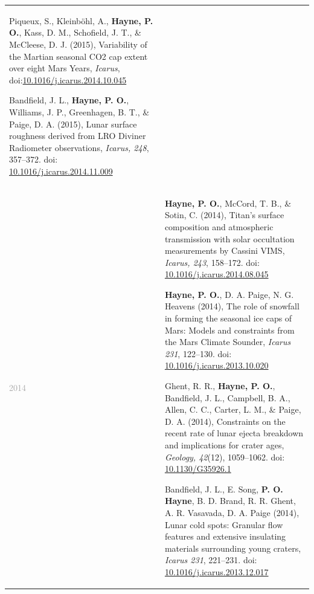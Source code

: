 \documentclass[letterpaper,10pt,twoside]{article}
\begin{document}
\begin{longtable}{@{} p{} p{}}
\begin{enumerate} [leftmargin=!,labelindent=2.5pt,itemindent=-10pt]
{            \item Piqueux, S., Kleinb{\"o}hl, A., {\bf Hayne, P. O.}, Kass, D. M., Schofield, J. T., \& McCleese, D. J. (2015), Variability of the Martian seasonal CO2 cap extent over eight Mars Years, {\it Icarus}, doi:\href{https://doi.org/10.1016/j.icarus.2014.10.045}{10.1016/j.icarus.2014.10.045}
    
            \item Bandfield, J. L., {\bf Hayne, P. O.}, Williams, J. P., Greenhagen, B. T., \& Paige, D. A. (2015), Lunar surface roughness derived from LRO Diviner Radiometer observations, {\it Icarus, 248}, 357--372. doi: \href{https://doi.org/10.1016/j.icarus.2014.11.009}{10.1016/j.icarus.2014.11.009}
            }
            \end{enumerate} \\
            
     \textcolor{darkgray}{2014}    & \begin{enumerate} [leftmargin=!,labelindent=2.5pt,itemindent=-10pt]\setcounter{enumi}{93}
            {\small
            \item {\bf Hayne, P. O.}, McCord, T. B., \& Sotin, C. (2014), Titan's surface composition and atmospheric transmission with solar occultation measurements by Cassini VIMS, {\it Icarus, 243}, 158--172. doi: \href{https://doi.org/10.1016/j.icarus.2014.08.045}{10.1016/j.icarus.2014.08.045}
    
            \item {\bf Hayne, P. O.}, D. A. Paige, N. G. Heavens (2014), The role of snowfall in forming the seasonal ice caps of Mars: Models and constraints from the Mars Climate Sounder, {\it Icarus 231}, 122--130. doi: \href{https://doi.org/10.1016/j.icarus.2013.10.020}{10.1016/j.icarus.2013.10.020}
    
            \item Ghent, R. R., {\bf Hayne, P. O.}, Bandfield, J. L., Campbell, B. A., Allen, C. C., Carter, L. M., \& Paige, D. A. (2014), Constraints on the recent rate of lunar ejecta breakdown and implications for crater ages, {\it Geology, 42}(12), 1059--1062. doi: \href{https://doi.org/10.1130/G35926.1}{10.1130/G35926.1}
    
            \item Bandfield, J. L., E. Song, {\bf P. O. Hayne}, B. D. Brand, R. R. Ghent, A. R. Vasavada, D. A. Paige (2014), Lunar cold spots: Granular flow features and extensive insulating materials surrounding young craters, {\it Icarus 231}, 221--231. doi: \href{https://doi.org/10.1016/j.icarus.2013.12.017}{10.1016/j.icarus.2013.12.017}
    
}
\end{enumerate}
\end{longtable}
\end{document}
